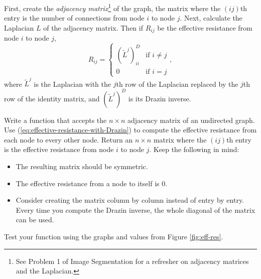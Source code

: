 First, create the \emph{adjacency matrix}\footnote{See Problem 1 of Image Segmentation for a refresher on adjacency matrices and the Laplacian.} of the graph, the matrix where the $(ij)$th entry is the number of connections from node $i$ to node $j$.
Next, calculate the Laplacian $L$ of the adjacency matrix.
Then if $R_{ij}$ be the effective resistance from node $i$ to node $j$,
\begin{equation}
R_{ij} = \begin{cases}
(\widetilde{L}^j)^D_{ii} & \mbox{if $i \neq j$} \\
0 & \mbox{if $i = j$}
\end{cases},
\label{eq:effective-resistance-with-Drazin}
\end{equation}
where $\widetilde{L}^j$ is the Laplacian with the $j$th row of the Laplacian replaced by the $j$th row of the identity matrix, and $(\widetilde{L}^j)^D$ is its Drazin inverse.

\begin{problem} %
Write a function that accepts the $n \times n$ adjacency matrix of an undirected graph.
Use (\ref{eq:effective-resistance-with-Drazin}) to compute the effective resistance from each node to every other node.
Return an $n \times n$ matrix where the $(ij)$th entry is the effective resistance from node $i$ to node $j$.
Keep the following in mind: %
\begin{itemize}
\item The resulting matrix should be symmetric.
\item The effective resistance from a node to itself is $0$.
\item Consider creating the matrix column by column instead of entry by entry. Every time you compute the Drazin inverse, the whole diagonal of the matrix can be used.
\end{itemize}
Test your function using the graphs and values from Figure \ref{fig:eff-res}.
\label{prob:effective-resistance}
\end{problem}

